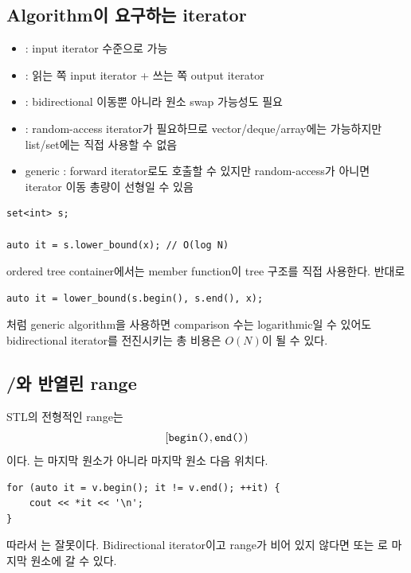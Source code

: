 \subsection{Algorithm이 요구하는 iterator}
\begin{itemize}
\item {}: input iterator 수준으로 가능
\item {}: 읽는 쪽 input iterator + 쓰는 쪽 output iterator
\item {}: bidirectional 이동뿐 아니라 원소 swap 가능성도 필요
\item {}: random-access iterator가 필요하므로 vector/deque/array에는 가능하지만 list/set에는 직접 사용할 수 없음
\item generic : forward iterator로도 호출할 수 있지만 random-access가 아니면 iterator 이동 총량이 선형일 수 있음
\end{itemize}

\begin{keybox}
\begin{lstlisting}
set<int> s;

auto it = s.lower_bound(x); // O(log N)
\end{lstlisting}

ordered tree container에서는 member function이 tree 구조를 직접 사용한다. 반대로

\begin{lstlisting}
auto it = lower_bound(s.begin(), s.end(), x);
\end{lstlisting}

처럼 generic algorithm을 사용하면 comparison 수는 logarithmic일 수 있어도 bidirectional iterator를 전진시키는 총 비용은 $O(N)$이 될 수 있다.
\end{keybox}

\subsection{/와 반열린 range}
STL의 전형적인 range는
\[
[\texttt{begin()},\texttt{end()})
\]
이다. 는 마지막 원소가 아니라 마지막 원소 다음 위치다.

\begin{lstlisting}
for (auto it = v.begin(); it != v.end(); ++it) {
    cout << *it << '\n';
}
\end{lstlisting}

따라서 는 잘못이다. Bidirectional iterator이고 range가 비어 있지 않다면  또는 로 마지막 원소에 갈 수 있다.

